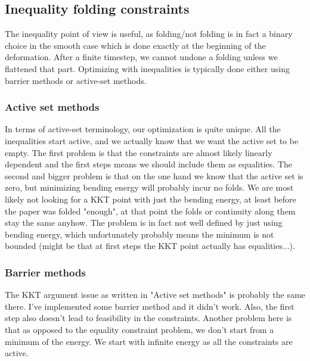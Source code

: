 \documentclass{article}
\theoremstyle{definition}
\begin{document}
\subsection{Inequality folding constraints}
The inequality point of view is useful, as folding/not folding is in fact a binary choice in the smooth case which is done exactly at the beginning of the deformation. After a finite timestep, we cannot undone a folding unless we flattened that part. Optimizing with inequalities is typically done either using barrier methods or active-set methods. 
\subsubsection{Active set methods}
In terms of active-set terminology, our optimization is quite unique. All the inequalities start active, and we actually know that we want the active set to be empty. The first problem is that the constraints are almost likely linearly dependent and the first steps means we should include them as equalities. The second and bigger problem is that on the one hand we know that the active set is zero, but minimizing bending energy will probably incur no folds. We are most likely not looking for a KKT point with just the bending energy, at least before the paper was folded "enough", at that point the folds or continuity along them stay the same anyhow. The problem is in fact not well defined by just using bending energy, which unfortunately probably means the minimum is not bounded (might be that at first steps the KKT point actually has equalities...).

\subsubsection{Barrier methods}
The KKT argument issue as written in "Active set methods" is probably the same there. I've implemented some barrier method and it didn't work. Also, the first step also doesn't lead to feasibility in the constraints. Another problem here is that as opposed to the equality constraint problem, we don't start from a minimum of the energy. We start with infinite energy as all the constraints are active.
\end{document}
